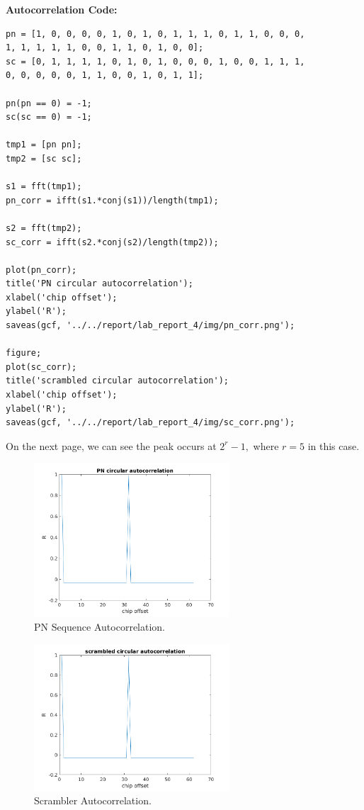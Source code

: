 \documentclass{article}
\begin{document}
\textbf{Autocorrelation Code:}

\begin{verbatim}
pn = [1, 0, 0, 0, 0, 1, 0, 1, 0, 1, 1, 1, 0, 1, 1, 0, 0, 0, 
1, 1, 1, 1, 1, 0, 0, 1, 1, 0, 1, 0, 0];
sc = [0, 1, 1, 1, 1, 0, 1, 0, 1, 0, 0, 0, 1, 0, 0, 1, 1, 1,
0, 0, 0, 0, 0, 1, 1, 0, 0, 1, 0, 1, 1];

pn(pn == 0) = -1;
sc(sc == 0) = -1;

tmp1 = [pn pn];
tmp2 = [sc sc];

s1 = fft(tmp1);
pn_corr = ifft(s1.*conj(s1))/length(tmp1);

s2 = fft(tmp2);
sc_corr = ifft(s2.*conj(s2)/length(tmp2));

plot(pn_corr);
title('PN circular autocorrelation');
xlabel('chip offset');
ylabel('R');
saveas(gcf, '../../report/lab_report_4/img/pn_corr.png');

figure;
plot(sc_corr);
title('scrambled circular autocorrelation');
xlabel('chip offset');
ylabel('R');
saveas(gcf, '../../report/lab_report_4/img/sc_corr.png');
\end{verbatim}

On the next page, we can see the peak occurs at $2^r - 1, $ where $r = 5$ in this case.
\break
\begin{figure}[h]
  \begin{center}
    \includegraphics[width=0.65\textwidth]{img/pn_corr.png}
    \caption{PN Sequence Autocorrelation.}
  \end{center}
\end{figure}
\begin{figure}[h]
  \begin{center}
    \includegraphics[width=0.65\textwidth]{img/sc_corr.png}
    \caption{Scrambler Autocorrelation.}
  \end{center}
\end{figure}
\end{document}

